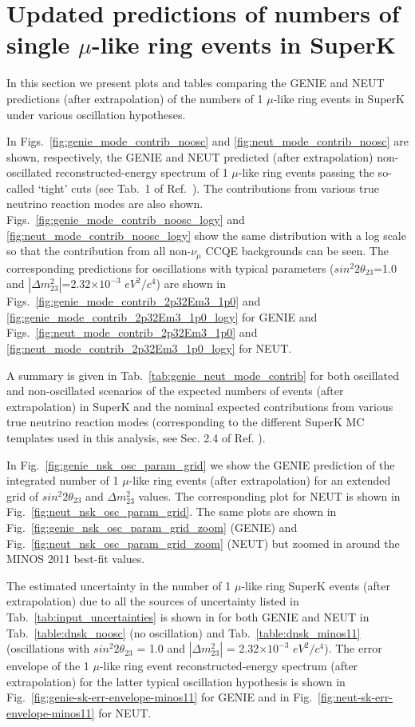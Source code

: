 \section {Updated predictions of numbers of single $\mu$-like ring events in SuperK}
\label{sec:updated_predictions}

In this section we present plots and tables comparing the GENIE and NEUT predictions (after extrapolation) of the numbers of 1 $\mu$-like ring events in SuperK under various oscillation hypotheses.

In Figs.\ \ref{fig:genie_mode_contrib_noosc} and \ref{fig:neut_mode_contrib_noosc} are shown,
respectively, the GENIE and NEUT predicted (after extrapolation)
non-oscillated reconstructed-energy spectrum of 1 $\mu$-like ring events 
passing the so-called `tight' cuts (see Tab.\ 1 of Ref.\ \cite{OurRun1DisappAnalysis}). 
The contributions from various true neutrino reaction modes are also shown. 
Figs.\ \ref{fig:genie_mode_contrib_noosc_logy} and \ref{fig:neut_mode_contrib_noosc_logy} show
the same distribution with a log scale so that the contribution from all
non-$\nu_{\mu}$ CCQE backgrounds can be seen.
The corresponding predictions for oscillations with typical parameters
($sin^{2}2\theta_{23}$=1.0 and $|\Delta m^{2}_{23}|$=2.32$\times10^{-3}$ $eV^{2}/c^{4}$)
are shown in 
Figs.\ \ref{fig:genie_mode_contrib_2p32Em3_1p0} and \ref{fig:genie_mode_contrib_2p32Em3_1p0_logy} for GENIE and 
Figs.\ \ref{fig:neut_mode_contrib_2p32Em3_1p0} and \ref{fig:neut_mode_contrib_2p32Em3_1p0_logy} for NEUT.

A summary is given in Tab.\ \ref{tab:genie_neut_mode_contrib} for both oscillated and
non-oscillated scenarios  of
the expected numbers of events (after extrapolation) in SuperK and the
nominal expected contributions from various true neutrino reaction
modes (corresponding to the different SuperK MC templates used in this
analysis, see Sec. 2.4 of Ref. \cite{OurRun1DisappAnalysis}).

In Fig.\ \ref{fig:genie_nsk_osc_param_grid} we show the GENIE prediction of the integrated number 
of 1 $\mu$-like ring events (after extrapolation) for 
an extended grid of $sin^{2}2\theta_{23}$ and $\Delta m^{2}_{23}$ values.
The corresponding plot for NEUT is shown in Fig.\ \ref{fig:neut_nsk_osc_param_grid}.
The same plots are shown in Fig.\ \ref{fig:genie_nsk_osc_param_grid_zoom}
(GENIE) and Fig.\ \ref{fig:neut_nsk_osc_param_grid_zoom} (NEUT)
but zoomed in around the MINOS 2011 best-fit values.

The estimated uncertainty in the number of 1 $\mu$-like ring SuperK events (after extrapolation) due to all the sources of uncertainty listed in
Tab.\ \ref{tab:input_uncertainties}
is shown in for both GENIE and NEUT in
Tab.\ \ref{table:dnsk_noosc} (no oscillation) and
Tab.\ \ref{table:dnsk_minos11} (oscillations with 
$sin^{2}2\theta_{23}$ = 1.0 and $|\Delta m^{2}_{23}|$ = 2.32$\times10^{-3}$ $eV^{2}/c^{4}$).
The error envelope of the 1 $\mu$-like ring event reconstructed-energy spectrum (after extrapolation)
for the latter typical oscillation hypothesis is shown 
in Fig.\ \ref{fig:genie-sk-err-envelope-minos11} for GENIE and
in Fig.\ \ref{fig:neut-sk-err-envelope-minos11} for NEUT.

